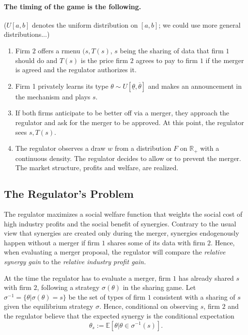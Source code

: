 \documentclass[a4paper]{article}
\newcommand{\E}{\mathbb E}
\renewcommand{\t}{\theta}
\begin{document}
\begin{itemize}
\end{itemize}

\paragraph{The timing of the game is the following.} ($U[a,b]$ denotes the uniform distribution on $[a,b]$; we could use more general distributions...)
\begin{enumerate}\setlength\itemsep{0em}
    \item Firm $2$ offers a rmenu $(s,T(s)$, $s$ being the sharing of data that firm $1$ should do and $T(s)$ is the price firm $2$ agrees to pay to firm $1$ if the merger is agreed and the regulator authorizes it.
    \item Firm 1 privately learns its type $\t\sim U[\underline{\t},\overline{\t}]$ and makes an announcement in the mechanism and plays $s$.
    \item If both firms anticipate to be better off via a merger, they approach the regulator  and ask for the merger to be approved. At this point, the regulator sees $s,T(s)$.
    \item The regulator observes a draw $w$ from a distribution $F$ on $\mathbb R_+$ with a continuous density. The regulator decides to allow or to prevent the merger. The market structure, profits and welfare, are realized.
\end{enumerate}
%
\subsection{The Regulator's Problem}
   The regulator maximizes a social welfare function that weights the social cost of high industry profits and the social benefit of synergies. Contrary to the usual view that synergies are created only during the merger, synergies endogenously happen without a merger if firm $1$ shares some of its data with firm $2$. Hence, when evaluating a merger proposal, the regulator will compare the \emph{relative synergy gain} to the \emph{relative industry profit gain.}

   At the time the regulator has to evaluate a merger, firm $1$ has already shared $s$ with firm $2$, following a strategy $\sigma(\t)$ in the sharing game.  Let $\sigma^{-1}=\{\t|\sigma(\t)=s\}$ be the set of types of firm $1$ consistent with a sharing of $s$ given the equilibrium strategy $\sigma$. Hence, conditional on observing $s$, firm $2$ and the regulator believe that the expected synergy is the conditional expectation $$\t_s:=\E[\t|\t\in\sigma^{-1}(s)].$$
     
\end{document}
